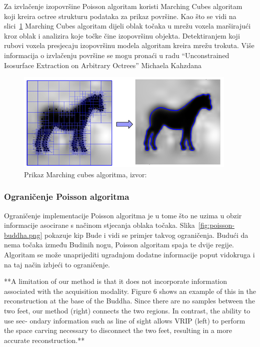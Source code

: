 Za izvlačenje izopovršine Poisson algoritam koristi Marching Cubes
algoritam~\cite{Lorensen87marchingcubes} koji kreira octree strukturu
podataka za prikaz površine.  Kao što se vidi na
slici~\ref{fig:poisson-marching-cubes.png} Marching Cubes algoritam
dijeli oblak točaka u mrežu voxela marširajući kroz oblak i analizira
koje točke čine izopovršinu objekta.  Detektiranjem koji rubovi voxela
presjecaju izopovršinu modela algoritam kreira mrežu trokuta. Više
informacija o izvlačenju površine se mogu pronaći u radu “Unconstrained
Isosurface Extraction on Arbitrary Octrees” Michaela
Kahzdana~\cite{Kazhdan:2007}

\begin{figure}[h]
\centering
\includegraphics[scale=0.8]{figures/poisson-marching-cubes.png}
\caption[]{Prikaz Marching cubes algoritma, izvor:~\cite{Kazhdan:2007}}
\label{fig:poisson-marching-cubes.png}
\end{figure}


\subsubsection{Ograničenje Poisson algoritma} %
\label{ssub:Ograničenje Poisson algoritma}

Ograničenje implementacije Poisson algoritma je u tome što ne uzima u
obzir informacije asocirane s načinom stjecanja oblaka točaka.
Slika~\ref{fig:poisson-buddha.png} pokazuje kip Bude i vidi se primjer takvog
ograničenja. Budući da nema točaka između Budinih nogu, Poisson
algoritam spaja te dvije regije. Algoritam se može unaprijediti
ugradnjom dodatne informacije poput vidokruga i na taj način izbjeći to
ograničenje.

**A limitation of our method
is that it does not incorporate information associated with
the acquisition modality. Figure 6 shows an example of this
in the reconstruction at the base of the Buddha. Since there
are no samples between the two feet, our method (right)
connects the two regions. In contrast, the ability to use sec-
ondary information such as line of sight allows VRIP (left)
to perform the space carving necessary to disconnect the two
feet, resulting in a more accurate reconstruction.**


